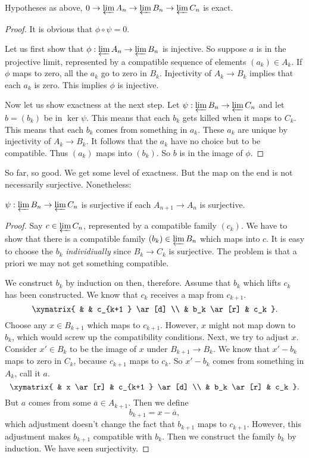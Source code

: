 \begin{proposition} 
Hypotheses as above, $ 0 \to \varprojlim A_n \to \varprojlim B_n \to
\varprojlim C_n$ is exact. 
\end{proposition} 
\begin{proof} 
It is obvious that $\phi \circ \psi = 0$. 

Let us first show that $\phi: \varprojlim A_n \to \varprojlim B_n$ is
injective. So suppose $a $ is in the projective limit, represented by a
compatible sequence of elements $(a_k )\in A_k$. If $\phi$ maps to zero, all
the $a_k$ go to zero in $B_k$. Injectivity of $A_k \to B_k$ implies that each
$a_k$ is zero. This implies $\phi$ is injective. 

Now let us show exactness at the next step. Let $\psi:  \varprojlim B_n \to
\varprojlim C_n$ and let $b = (b_k)$ be in $\ker \psi$. This means that each
$b_k$ gets killed when it maps to $C_k$. This means that each $b_k$ comes from
something in $a_k$. These $a_k$ are unique by injectivity of $A_k \to B_k$. It
follows that the $a_k$ have no choice but to be compatible. Thus $(a_k)$ maps
into $(b_k)$. So $b$ is in the image of $\phi$. 
\end{proof} 

So far, so good. We get some level of exactness. But the map on the end is not
necessarily surjective. Nonetheless:

\begin{proposition} 
$\psi: \varprojlim B_n \to \varprojlim C_n$ is surjective if each $A_{n+1} \to
A_n$ is surjective.
\end{proposition} 
\begin{proof} 
Say $c \in \varprojlim C_n$, represented by a compatible family $(c_k)$. We
have to show that there is a compatible family $(b_k) \in \varprojlim B_n$
which maps into $c$. It is easy to choose the $b_k$ \emph{individiually} since
$B_k \to C_k$ is surjective. The problem is that a priori we may not get
something compatible.

We construct $b_k$ by induction on then, therefore. Assume that $b_k$ which
lifts $c_k$ has been constructed. 
We know that $c_k$ receives  a map from $c_{k+1}$. 
\[ \xymatrix{
& & c_{k+1 } \ar[d] \\
& b_k \ar[r] &  c_k
}.\]
Choose any $x \in B_{k+1}$ which maps to $c_{k+1}$. However, $x$ might not map
down to $b_k$, which would screw up the compatibility conditions. Next, we try to adjust $x$. 
Consider $x' \in B_k$ to be the image of $x$ under $B_{k+1} \to B_k$. We know
that $x' - b_k$ maps to zero in $C_k$, because $c_{k+1}$ maps to $c_k$.
So $x' - b_k$ comes from something in $A_k$, call it $a$. 
\[ \xymatrix{
& x \ar[r] &  c_{k+1 } \ar[d] \\
& b_k \ar[r] &  c_k
}.\]
But $a$ comes from some $\overline{a} \in A_{k+1}$. Then we define
\[ b_{k+1} = x - \overline{a},  \]
which adjustment doesn't change the fact that $b_{k+1}$ maps to $c_{k+1}$.
However, this adjustment makes $b_{k+1}$ compatible with $b_k$. Then we
construct the family $b_k$ by induction. We have seen surjectivity.
\end{proof} 

